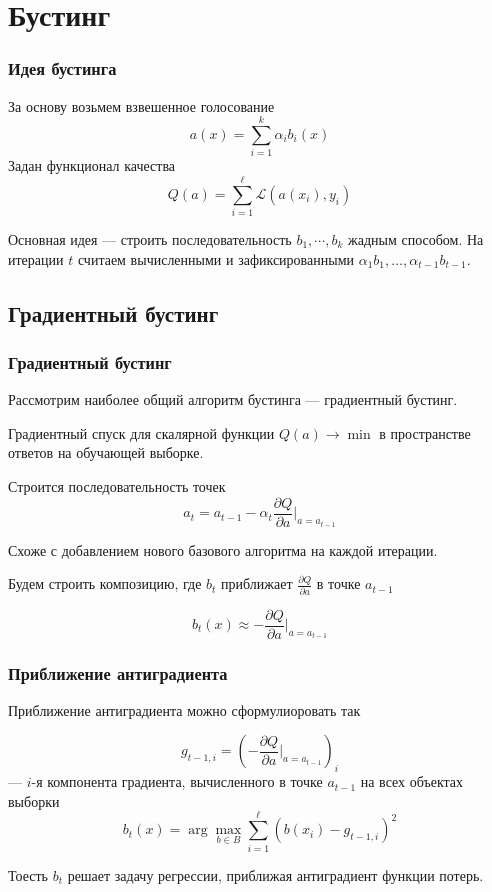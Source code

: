 \documentclass{beamer}
\newcommand{\at}[2][]{#1|_{#2}}
\newcommand{\dd}[2]{\frac{\partial #1}{\partial #2}}
\begin{document}
	\section{Бустинг}

	\begin{frame}
		\frametitle{Идея бустинга}

		За основу возьмем взвешенное голосование
		\[
		a(x) = \sum_{i=1}^{k} \alpha_i b_i(x)
		\]
		Задан функционал качества
		\[
		Q(a) = \sum_{i=1}^{\ell} \mathcal{L} (a(x_i), y_i)
		\] 

		Основная идея --- строить последовательность $b_1, \cdots, b_k$ жадным способом.
		На итерации $t$ считаем вычисленными и зафиксированными $\alpha_1 b_1, \dots, \alpha_{t-1}b_{t-1}$.
	\end{frame}

	\subsection{Градиентный бустинг}
	
	\begin{frame}
		\frametitle{Градиентный бустинг}
		Рассмотрим наиболее общий алгоритм бустинга --- градиентный бустинг. 

		\vspace{15pt}

		Градиентный спуск для скалярной функции $Q(a) \rightarrow \min$ в пространстве ответов на обучающей выборке.

		Строится последовательность точек
		\[
		a_t = a_{t-1} - \alpha_t \dd{Q}{a} \at[\Big]{a = a_{t-1}}
		\]

		Схоже с добавлением нового базового алгоритма на каждой итерации.

		\vspace{15pt}
		
		Будем строить композицию, где $b_t$ приближает $\dd{Q}{a}$ в точке $a_{t-1}$

		\[
		b_t(x) \approx - \dd{Q}{a} \at[\Big]{a=a_{t-1}}
		\]
	\end{frame}
	
	\begin{frame}
		\frametitle{Приближение антиградиента}

		Приближение антиградиента можно сформулиоровать так

		\[
		g_{t-1, i} = \left( - \dd{Q}{a}\at[\Big]{a = a_{t-1}} \right)_i
		\]
		--- $i$-я компонента градиента, вычисленного в точке $a_{t-1}$ на всех объектах выборки
		\[
		b_t(x) = \arg \max_{b \in B} \sum_{i=1}^{\ell} \left( b(x_i) - g_{t-1, i} \right)^2
		\]

		Тоесть $b_t$ решает задачу регрессии, приближая антиградиент функции потерь.
	\end{frame}
\end{document}

